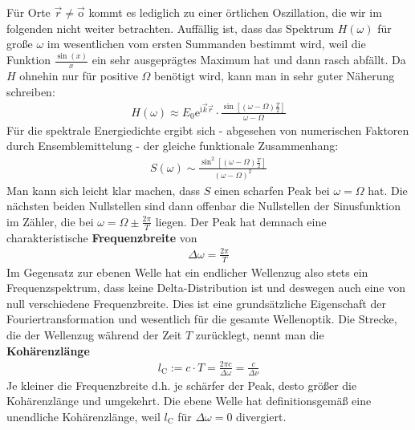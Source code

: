 \documentclass[german,  %
parskip=full,  %
]{scrartcl}
\begin{document}
Für Orte \(\vec{r}\neq \vec{\mathrm{o}}\) kommt es lediglich zu einer örtlichen Oszillation, die wir im folgenden nicht weiter betrachten. Auffällig ist, dass das Spektrum \(H(\omega)\) für große \(\omega\) im wesentlichen vom ersten Summanden bestimmt wird, weil die Funktion \(\frac{\sin(x)}{x}\) ein sehr ausgeprägtes Maximum hat und dann rasch abfällt. Da \(H\) ohnehin nur für positive \(\Omega\) benötigt wird, kann man in sehr guter Näherung schreiben:
\begin{align}
H(\omega) \approx E_0 \mathrm{e}^{\mathrm{i}\vec{k}\vec{r}}\cdot \frac{\sin\left[(\omega - \Omega)\frac{T}{2}\right]}{\omega - \Omega}  
\end{align}
Für die spektrale Energiedichte ergibt sich - abgesehen von numerischen Faktoren durch Ensemblemittelung - der gleiche funktionale Zusammenhang:
\begin{align}
S(\omega) \sim \frac{\sin^2\left[(\omega - \Omega)\frac{T}{2}\right]}{(\omega - \Omega)^2}  
\end{align}
Man kann sich leicht klar machen, dass \(S\) einen scharfen Peak bei \(\omega=\Omega\) hat. Die nächsten beiden Nullstellen sind dann offenbar die Nullstellen der Sinusfunktion im Zähler, die bei \(\omega = \Omega \pm \frac{2\pi}{T}\) liegen. Der Peak hat demnach eine charakteristische \textbf{Frequenzbreite} von
\begin{align}
\Delta \omega = \frac{2\pi}{T}  
\end{align}
Im Gegensatz zur ebenen Welle hat ein endlicher Wellenzug also stets ein Frequenzspektrum, dass keine Delta-Distribution ist und deswegen auch eine von null verschiedene Frequenzbreite. Dies ist eine grundsätzliche Eigenschaft der Fouriertransformation und wesentlich für die gesamte Wellenoptik. Die Strecke, die der Wellenzug während der Zeit \(T\) zurücklegt, nennt man die \textbf{Kohärenzlänge}
\begin{align}
l_{\mathrm{C}} := c\cdot T = \frac{2\pi c}{\Delta\omega} = \frac{c}{\Delta\nu} 
\end{align}
Je kleiner die Frequenzbreite d.h. je schärfer der Peak, desto größer die Kohärenzlänge und umgekehrt. Die ebene Welle hat definitionsgemäß eine unendliche Kohärenzlänge, weil \(l_{\mathrm{C}}\) für \(\Delta\omega = 0\) divergiert. 
\end{document}
